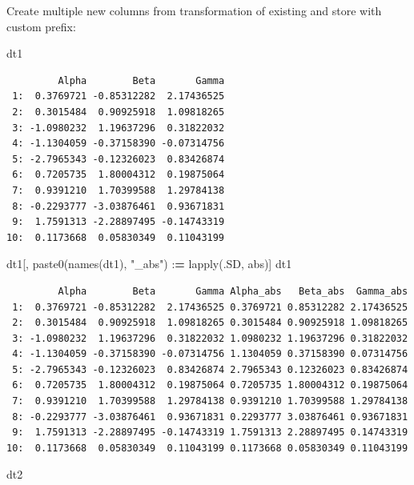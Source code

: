 \documentclass[
]{book}
\newenvironment{Shaded}{\begin{snugshade}}{\end{snugshade}}
\newcommand{\ErrorTok}[1]{\textcolor[rgb]{0.64,0.00,0.00}{\textbf{#1}}}
\newcommand{\FunctionTok}[1]{\textcolor[rgb]{0.00,0.00,0.00}{#1}}
\newcommand{\NormalTok}[1]{#1}
\newcommand{\SpecialCharTok}[1]{\textcolor[rgb]{0.00,0.00,0.00}{#1}}
\newcommand{\StringTok}[1]{\textcolor[rgb]{0.31,0.60,0.02}{#1}}
\begin{document}
Create multiple new columns from transformation of existing and store with custom prefix:

\begin{Shaded}
\begin{Highlighting}[]
\NormalTok{dt1}
\end{Highlighting}
\end{Shaded}

\begin{verbatim}
         Alpha        Beta       Gamma
 1:  0.3769721 -0.85312282  2.17436525
 2:  0.3015484  0.90925918  1.09818265
 3: -1.0980232  1.19637296  0.31822032
 4: -1.1304059 -0.37158390 -0.07314756
 5: -2.7965343 -0.12326023  0.83426874
 6:  0.7205735  1.80004312  0.19875064
 7:  0.9391210  1.70399588  1.29784138
 8: -0.2293777 -3.03876461  0.93671831
 9:  1.7591313 -2.28897495 -0.14743319
10:  0.1173668  0.05830349  0.11043199
\end{verbatim}

\begin{Shaded}
\begin{Highlighting}[]
\NormalTok{dt1[, }\FunctionTok{paste0}\NormalTok{(}\FunctionTok{names}\NormalTok{(dt1), }\StringTok{"\_abs"}\NormalTok{) }\SpecialCharTok{:}\ErrorTok{=} \FunctionTok{lapply}\NormalTok{(.SD, abs)]}
\NormalTok{dt1}
\end{Highlighting}
\end{Shaded}

\begin{verbatim}
         Alpha        Beta       Gamma Alpha_abs   Beta_abs  Gamma_abs
 1:  0.3769721 -0.85312282  2.17436525 0.3769721 0.85312282 2.17436525
 2:  0.3015484  0.90925918  1.09818265 0.3015484 0.90925918 1.09818265
 3: -1.0980232  1.19637296  0.31822032 1.0980232 1.19637296 0.31822032
 4: -1.1304059 -0.37158390 -0.07314756 1.1304059 0.37158390 0.07314756
 5: -2.7965343 -0.12326023  0.83426874 2.7965343 0.12326023 0.83426874
 6:  0.7205735  1.80004312  0.19875064 0.7205735 1.80004312 0.19875064
 7:  0.9391210  1.70399588  1.29784138 0.9391210 1.70399588 1.29784138
 8: -0.2293777 -3.03876461  0.93671831 0.2293777 3.03876461 0.93671831
 9:  1.7591313 -2.28897495 -0.14743319 1.7591313 2.28897495 0.14743319
10:  0.1173668  0.05830349  0.11043199 0.1173668 0.05830349 0.11043199
\end{verbatim}

\begin{Shaded}
\begin{Highlighting}[]
\NormalTok{dt2}
\end{Highlighting}
\end{Shaded}
\end{document}
